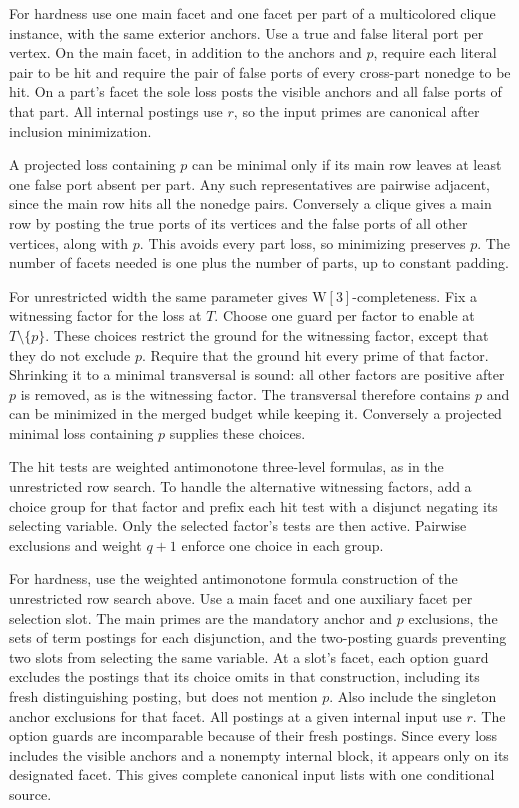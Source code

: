 For hardness use one main facet and one facet
per part of a multicolored clique instance,
with the same exterior anchors. Use a true
and false literal port per vertex. On the
main facet, in addition to the anchors and
$p$, require each literal pair to be hit and
require the pair of false ports of every
cross-part nonedge to be hit. On a part's
facet the sole loss posts the visible anchors
and all false ports of that part. All internal
postings use $r$, so the input primes are
canonical after inclusion minimization.

A projected loss containing $p$ can be
minimal only if its main row leaves at least
one false port absent per part. Any such
representatives are pairwise adjacent, since
the main row hits all the nonedge pairs.
Conversely a clique gives a main row by
posting the true ports of its vertices and
the false ports of all other vertices, along
with $p$. This avoids every part loss, so
minimizing preserves $p$. The number of
facets needed is one plus the number of
parts, up to constant padding.

For unrestricted width the same parameter gives
$\mathrm W[3]$-completeness. Fix a witnessing
factor for the loss at $T$. Choose one guard per
factor to enable at $T\setminus\{p\}$. These
choices restrict the ground for the witnessing
factor, except that they do not exclude $p$.
Require that the ground hit every prime of that
factor. Shrinking it to a minimal transversal
is sound: all other factors are positive after
$p$ is removed, as is the witnessing factor.
The transversal therefore contains $p$ and can
be minimized in the merged budget while keeping
it. Conversely a projected minimal loss
containing $p$ supplies these choices.

The hit tests are weighted antimonotone
three-level formulas, as in the unrestricted
row search. To handle the alternative witnessing
factors, add a choice group for that factor
and prefix each hit test with a disjunct
negating its selecting variable. Only the
selected factor's tests are then active.
Pairwise exclusions and weight $q+1$ enforce
one choice in each group.

For hardness, use the weighted antimonotone
formula construction of the unrestricted row
search above. Use a main facet and one auxiliary
facet per selection slot. The main primes are
the mandatory anchor and $p$ exclusions,
the sets of term postings for each disjunction,
and the two-posting guards preventing two
slots from selecting the same variable. At
a slot's facet, each option guard excludes
the postings that its choice omits in that
construction, including its fresh distinguishing
posting, but does not mention $p$. Also include
the singleton anchor exclusions for that facet.
All postings at a given internal input use
$r$. The option guards are incomparable
because of their fresh postings. Since every
loss includes the visible anchors and a
nonempty internal block, it appears only on
its designated facet. This gives complete
canonical input lists with one conditional
source.


